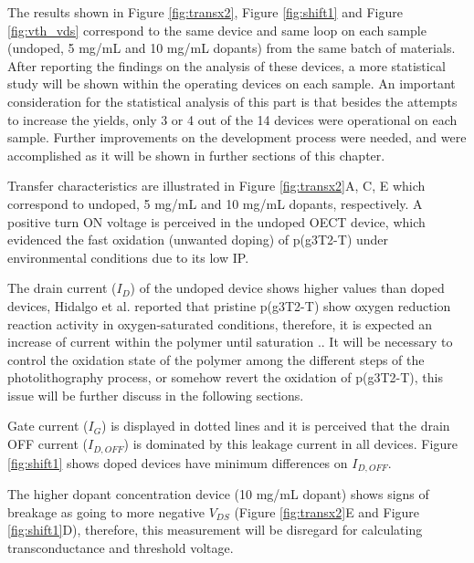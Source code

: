 The results shown in Figure \ref{fig:transx2}, Figure \ref{fig:shift1} and Figure \ref{fig:vth_vds} correspond to the same device and same loop on each sample (undoped, 5 mg/mL and 10 mg/mL dopants) from the same batch of materials. After reporting the findings on the analysis of these devices, a more statistical study will be shown within the operating devices on each sample. An important consideration for the statistical analysis of this part is that besides the attempts to increase the yields, only 3 or 4 out of the 14 devices were operational on each sample. Further improvements on the development process were needed, and were accomplished as it will be shown in further sections of this chapter. 

Transfer characteristics are illustrated in Figure \ref{fig:transx2}A, C, E which correspond to undoped, 5 mg/mL and 10 mg/mL dopants, respectively. A positive turn ON voltage is perceived in the undoped OECT device, which evidenced the fast oxidation (unwanted doping) of p(g3T2-T) under environmental conditions due to its low IP. 

The drain current ($I_{D}$) of the undoped device shows higher values than doped devices, Hidalgo et al. reported that pristine p(g3T2-T) show oxygen reduction reaction activity in oxygen-saturated conditions, therefore, it is expected an increase of current within the polymer until saturation \cite{hidalgocastilloSimultaneousPerformanceStability2022a}.. It will be necessary to control the oxidation state of the polymer among the different steps of the photolithography process, or somehow revert the oxidation of p(g3T2-T), this issue will be further discuss in the following sections.

Gate current ($I_{G}$) is displayed in dotted lines and it is perceived that the drain OFF current ($I_{D,OFF}$) is dominated by this leakage current in all devices. Figure \ref{fig:shift1} shows doped devices have minimum differences on $I_{D,OFF}$.

The higher dopant concentration device (10 mg/mL dopant) shows signs of breakage as going to more negative $V_{DS}$ (Figure \ref{fig:transx2}E and Figure \ref{fig:shift1}D), therefore, this measurement will be disregard for calculating transconductance and threshold voltage.

